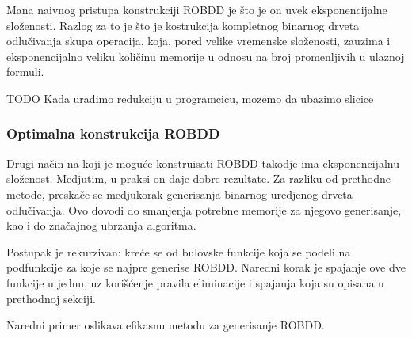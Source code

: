 Mana naivnog pristupa konstrukciji ROBDD je \v{s}to je on uvek eksponencijalne slo\v{z}enosti. Razlog za to je \v{s}to je kostrukcija kompletnog binarnog drveta odlu\v{c}ivanja skupa operacija, koja, pored velike vremenske slo\v{z}enosti, zauzima i eksponencijalno veliku koli\v{c}inu memorije u odnosu na broj promenljivih u ulaznoj formuli.

\begin{exmp}
    TODO
    Kada uradimo redukciju u programcicu, mozemo da ubazimo slicice
\end{exmp}


\subsubsection{Optimalna konstrukcija ROBDD}
\label{subsubsec:optimalROBDDConstruction}

Drugi na\v{c}in na koji je mogu\'c{}e konstruisati ROBDD takodje ima eksponencijalnu slo\v{z}enost. Medjutim, u praksi on daje dobre rezultate. Za razliku od prethodne metode, preska\v{c}e se medjukorak generisanja binarnog uredjenog drveta odlu\v{c}ivanja. Ovo dovodi do smanjenja potrebne memorije za njegovo generisanje, kao i do zna\v{c}ajnog ubrzanja algoritma.

Postupak je rekurzivan: kre\'c{}e se od bulovske funkcije koja se podeli na podfunkcije za koje se najpre generise ROBDD. Naredni korak je spajanje ove dve funkcije u jednu, uz kori\v{s}\'c{}enje pravila eliminacije i spajanja koja su opisana u prethodnoj sekciji.

Naredni primer oslikava efikasnu metodu za generisanje ROBDD.


